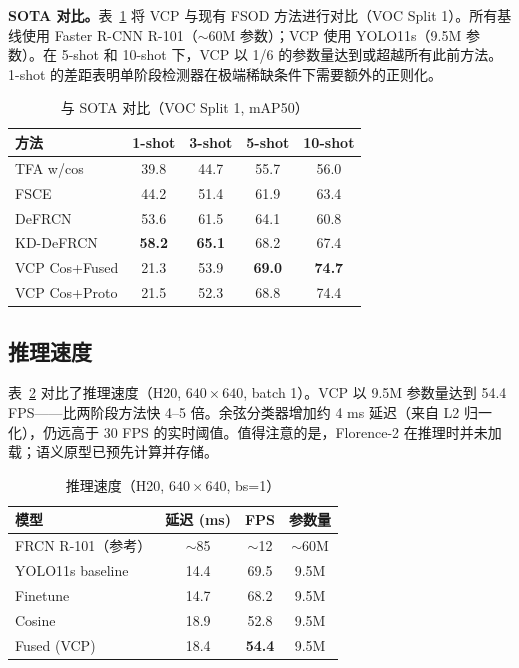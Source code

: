 \documentclass[conference]{IEEEtran}
\begin{document}
\textbf{SOTA 对比。}表~\ref{tab:sota} 将 VCP 与现有 FSOD 方法进行对比（VOC Split 1）。所有基线使用 Faster R-CNN R-101（$\sim$60M 参数）；VCP 使用 YOLO11s（9.5M 参数）。在 5-shot 和 10-shot 下，VCP 以 1/6 的参数量达到或超越所有此前方法。1-shot 的差距表明单阶段检测器在极端稀缺条件下需要额外的正则化。

\begin{table}[ht]
\centering\footnotesize
\caption{与 SOTA 对比（VOC Split 1, mAP50）}
\label{tab:sota}
\begin{tabular}{lcccc}
\toprule
方法 & 1-shot & 3-shot & 5-shot & 10-shot \\
\midrule
TFA w/cos        & 39.8 & 44.7 & 55.7 & 56.0 \\
FSCE             & 44.2 & 51.4 & 61.9 & 63.4 \\
DeFRCN           & 53.6 & 61.5 & 64.1 & 60.8 \\
KD-DeFRCN        & \textbf{58.2} & \textbf{65.1} & 68.2 & 67.4 \\
\midrule
VCP Cos+Fused    & 21.3 & 53.9 & \textbf{69.0} & \textbf{74.7} \\
VCP Cos+Proto    & 21.5 & 52.3 & 68.8 & 74.4 \\
\bottomrule
\end{tabular}
\end{table}

\subsection{推理速度}

表~\ref{tab:fps} 对比了推理速度（H20, $640\times640$, batch 1）。VCP 以 9.5M 参数量达到 54.4 FPS——比两阶段方法快 4--5 倍。余弦分类器增加约 4 ms 延迟（来自 L2 归一化），仍远高于 30 FPS 的实时阈值。值得注意的是，Florence-2 在推理时并未加载；语义原型已预先计算并存储。

\begin{table}[ht]
\centering
\caption{推理速度（H20, $640\times640$, bs=1）}
\label{tab:fps}
\begin{tabular}{lccc}
\toprule
模型 & 延迟 (ms) & FPS & 参数量 \\
\midrule
FRCN R-101（参考） & $\sim$85 & $\sim$12 & $\sim$60M \\
\midrule
YOLO11s baseline & 14.4 & 69.5 & 9.5M \\
Finetune          & 14.7 & 68.2 & 9.5M \\
Cosine            & 18.9 & 52.8 & 9.5M \\
Fused (VCP)       & 18.4 & \textbf{54.4} & 9.5M \\
\bottomrule
\end{tabular}
\end{table}
\end{document}
